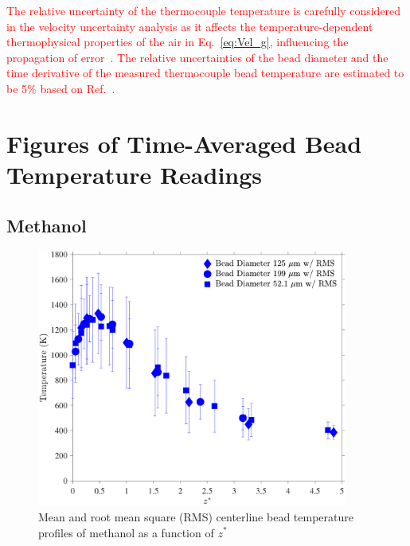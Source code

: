 \documentclass[12pt]{article}
\begin{document}
\textcolor{red}{The relative uncertainty of the thermocouple temperature is carefully considered in the velocity uncertainty analysis as it affects the temperature-dependent thermophysical properties of the air in  Eq.~\ref{eq:Vel_g}, influencing the propagation of error~\cite{Sung2021}. The relative uncertainties of the bead diameter and the time derivative of the measured thermocouple bead temperature are estimated to be 5\% based on Ref.~\cite{Sung2021}.}

\pagebreak

\section{Figures of Time-Averaged Bead Temperature Readings}\label{sec:Bead_Temp}

\subsection{Methanol}
\label{ssec:Methanol_Bead_Temp}

\begin{figure}[!h]
	\centering
\includegraphics[width=10.25cm,keepaspectratio]{Methanol_Bead_Temperature.pdf}
	\caption[Mean and RMS centerline bead temperature profile of nethanol]{Mean and root mean square (RMS) centerline bead temperature profiles of methanol as a function of $z^*$}
	\label{fig:Methanol_Bead_Temp}
\end{figure}

\pagebreak
\end{document}
